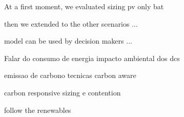 At a first moment, we evaluated sizing pv only bat

then we extended to the other scenarios ...

model can be used by decision makers ...


Falar do consumo de energia
impacto ambiental dos dcs

emissao de carbono
tecnicas carbon aware

carbon responsive
sizing e contention

follow the renewables


